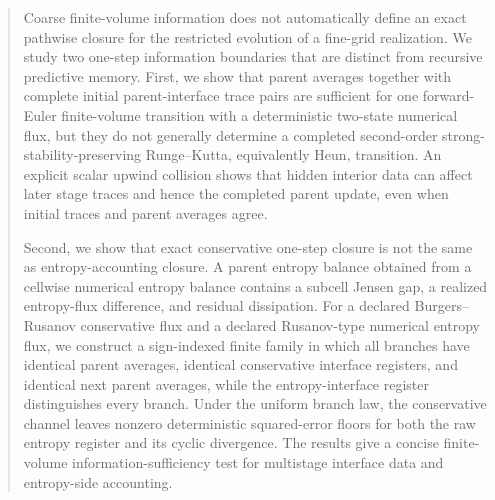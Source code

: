 \documentclass[a4paper,fleqn, sort&compress]{cas-sc}
\theoremstyle{remark}
\theoremstyle{definition}
\begin{document}












\begin{abstract}
Coarse finite-volume information does not automatically define an exact
pathwise closure for the restricted evolution of a fine-grid realization.  We
study two one-step information boundaries that are distinct from recursive
predictive memory.  First, we show that parent averages together with
complete initial parent-interface trace pairs are sufficient for one
forward-Euler finite-volume transition with a deterministic two-state
numerical flux, but they do not generally determine a completed
second-order strong-stability-preserving Runge--Kutta, equivalently Heun,
transition.  An explicit scalar upwind collision shows that hidden interior
data can affect later stage traces and hence the completed parent update,
even when initial traces and parent averages agree.

Second, we show that exact conservative one-step closure is not the same as
entropy-accounting closure.  A parent entropy balance obtained from a
cellwise numerical entropy balance contains a subcell Jensen gap, a realized
entropy-flux difference, and residual dissipation.  For a declared
Burgers--Rusanov conservative flux and a declared Rusanov-type numerical
entropy flux, we construct a sign-indexed finite family in which all branches
have identical parent averages, identical conservative interface registers,
and identical next parent averages, while the entropy-interface register
distinguishes every branch.  Under the uniform branch law, the conservative
channel leaves nonzero deterministic squared-error floors for both the raw
entropy register and its cyclic divergence.  The results give a concise
finite-volume information-sufficiency test for multistage interface data and
entropy-side accounting.
\end{abstract}
\end{document}
